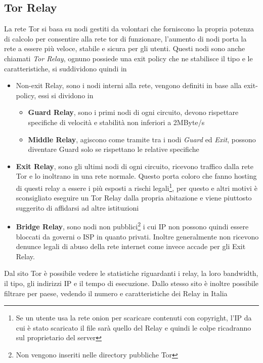 \subsection{Tor Relay}
La rete Tor si basa su nodi gestiti da volontari che forniscono la propria potenza di calcolo per consentire alla rete tor di funzionare, l'aumento di nodi porta la rete a essere più veloce, stabile e sicura per gli utenti. Questi nodi sono anche chiamati \emph{Tor Relay}, ognuno possiede una exit policy che ne stabilisce il tipo e le caratteristiche, si suddividono quindi in
\begin{itemize}
    \item Non-exit Relay, sono i nodi interni alla rete, vengono definiti in base alla exit-policy, essi si dividono in
    \begin{itemize}
        \item \textbf{Guard Relay}, sono i primi nodi di ogni circuito, devono rispettare specifiche di velocità e stabilità non inferiori a 2MByte/s
        \item \textbf{Middle Relay}, agiscono come tramite tra i nodi \emph{Guard} ed \emph{Exit}, possono diventare Guard solo se rispettano le relative specifiche
    \end{itemize}
    \item \textbf{Exit Relay}, sono gli ultimi nodi di ogni circuito, ricevono traffico dalla rete Tor e lo inoltrano in una rete normale. Questo porta coloro che fanno hosting di questi relay a essere i più esposti a rischi legali\footnote{Se un utente usa la rete onion per scaricare contenuti con copyright, l'IP da cui è stato scaricato il file sarà quello del Relay e quindi le colpe ricadranno sul proprietario del server}, per questo e altri motivi è sconsigliato eseguire un Tor Relay dalla propria abitazione e viene piuttosto suggerito di affidarsi ad altre istituzioni
    \item \textbf{Bridge Relay}, sono nodi non pubblici\footnote{Non vengono inseriti nelle directory pubbliche Tor} i cui IP non possono quindi essere bloccati da governi o ISP in quanto privati. Inoltre generalmente non ricevono denunce legali di abuso della rete internet come invece accade per gli Exit Relay.
\end{itemize}
\cite{TorRelay}
\cite{TorRelayTypes}
Dal sito Tor \cite{TorRelayMetrics} è possibile vedere le statistiche riguardanti i relay, la loro bandwidth, il tipo, gli indirizzi IP e il tempo di esecuzione. Dallo stesso sito è inoltre possibile filtrare per paese, vedendo il numero e caratteristiche dei Relay in Italia \\

